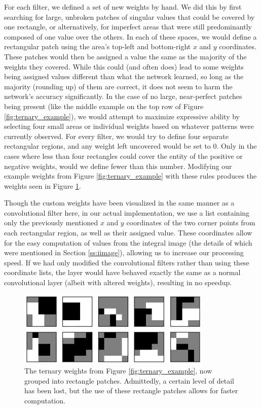 \documentclass[11pt,a4paper,oldfontcommands]{memoir}
\begin{document}
For each filter, we defined a set of new weights by hand. We did this by first searching for large, unbroken patches of singular values that could be covered by one rectangle, or alternatively, for imperfect areas that were still predominantly composed of one value over the others. In each of these spaces, we would define a rectangular patch using the area's top-left and bottom-right $x$ and $y$ coordinates. These patches would then be assigned a value the same as the majority of the weights they covered. While this could (and often does) lead to some weights being assigned values different than what the network learned, so long as the majority (rounding up) of them are correct, it does not seem to harm the network's accuracy significantly. In the case of no large, near-perfect patches being present (like the middle example on the top row of Figure \ref{fig:ternary_example}), we would attempt to maximize expressive ability by selecting four small areas or individual weights based on whatever patterns were currently observed. For every filter, we would try to define four separate rectangular regions, and any weight left uncovered would be set to 0. Only in the cases where less than four rectangles could cover the entity of the positive or negative weights, would we define fewer than this number. Modifying our example weights from Figure \ref{fig:ternary_example} with these rules produces the weights seen in Figure \ref{fig:ternary_block_example}. 

Though the custom weights have been visualized in the same manner as a convolutional filter here, in our actual implementation, we use a list containing only the previously mentioned $x$ and $y$ coordinates of the two corner points from each rectangular region, as well as their assigned value. These coordinates allow for the easy computation of values from the integral image (the details of which were mentioned in Section \ref{ss:iimage}), allowing us to increase our processing speed. If we had only modified the convolutional filters rather than using these coordinate lists, the layer would have behaved exactly the same as a normal convolutional layer (albeit with altered weights), resulting in no speedup. 

\begin{figure}[h]
    \centering
    \includegraphics[width=25em]{Methodology_Images/ternary_block_example.png}
    \caption{The ternary weights from Figure \ref{fig:ternary_example}, now grouped into rectangle patches. Admittedly, a certain level of detail has been lost, but the use of these rectangle patches allows for faster computation.}
    \label{fig:ternary_block_example}
\end{figure}
\end{document}
